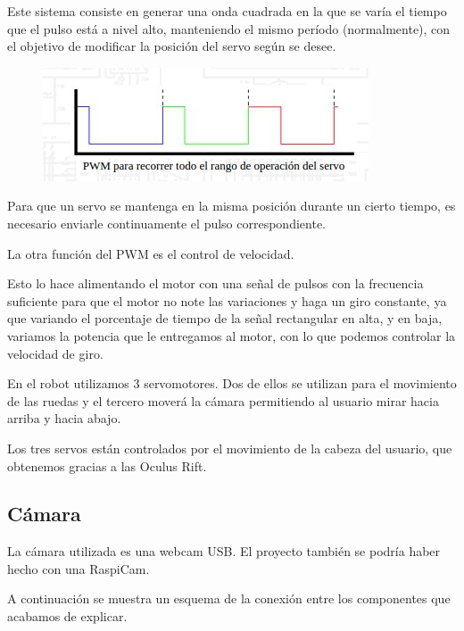 \documentclass[twoside, 12pt]{epstfg}
\begin{document}
Este sistema consiste en generar una onda cuadrada en la que se varía el tiempo que el pulso está a nivel alto, manteniendo el mismo período (normalmente), con el objetivo de modificar la posición del servo según se desee.

\begin{figure}[h]
	\centerline{
		\mbox{\includegraphics[width=.80\textwidth]{images/ondaServo.png}}
	}
	
\end{figure}



Para que un servo se mantenga en la misma posición durante un cierto tiempo, es necesario enviarle continuamente el pulso correspondiente.


La otra función del PWM es el control de velocidad.

Esto lo hace alimentando el motor con una señal de pulsos con la frecuencia suficiente para que el motor no note las variaciones y haga un giro constante, ya que variando el porcentaje de tiempo de la señal rectangular en alta, y en baja, variamos la potencia que le entregamos al motor, con lo que podemos controlar la velocidad de giro.

En el robot utilizamos 3 servomotores.
Dos de ellos se utilizan para el movimiento de las ruedas y el tercero moverá la cámara permitiendo al usuario mirar hacia arriba y hacia abajo.

Los tres servos están controlados por el movimiento de la cabeza del usuario, que obtenemos gracias a las Oculus Rift.

\subsection{Cámara}

La cámara utilizada es una webcam USB. El proyecto también se podría haber hecho con una RaspiCam.

A continuación se muestra un esquema de la conexión entre los componentes que acabamos de explicar.
\end{document}
